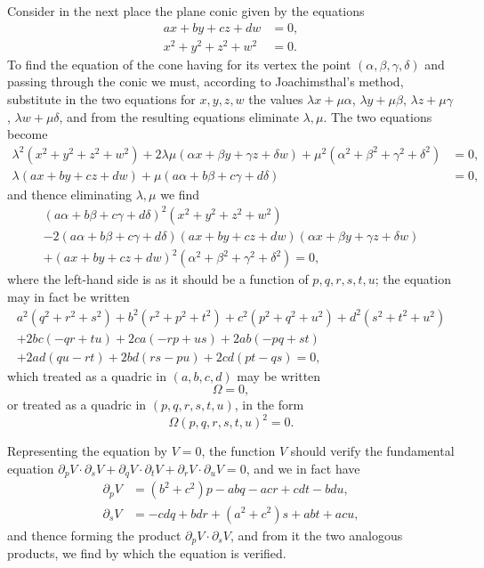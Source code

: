 \documentclass[11pt,a4paper]{article}
\theoremstyle{plain}
\begin{document}
Consider in the next place the plane conic given by the equations
\begin{align*}
ax + by + cz + dw &= 0,\\
x^2 + y^2 + z^2 + w^2 &= 0.
\end{align*}
To find the equation of the cone having for its vertex the point $(\alpha, \beta, \gamma, \delta)$ and passing through the conic we must, according to Joachimsthal's method, substitute in the two equations for $x, y, z, w$ the values $\lambda x + \mu\alpha$, $\lambda y + \mu\beta$, $\lambda z + \mu\gamma$, $\lambda w + \mu\delta$, and from the resulting equations eliminate $\lambda, \mu$. The two equations become
\begin{align*}
\lambda^2(x^2 + y^2 + z^2 + w^2) + 2\lambda\mu(\alpha x + \beta y + \gamma z + \delta w) + \mu^2(\alpha^2 + \beta^2 + \gamma^2 + \delta^2) &= 0,\\
\lambda(ax + by + cz + dw) + \mu(a\alpha + b\beta + c\gamma + d\delta) &= 0,
\end{align*}
and thence eliminating $\lambda, \mu$ we find
\begin{multline*}
(a\alpha + b\beta + c\gamma + d\delta)^2(x^2 + y^2 + z^2 + w^2)\\
- 2(a\alpha + b\beta + c\gamma + d\delta)(ax + by + cz + dw)(\alpha x + \beta y + \gamma z + \delta w)\\
+ (ax + by + cz + dw)^2(\alpha^2 + \beta^2 + \gamma^2 + \delta^2) = 0,
\end{multline*}
where the left-hand side is as it should be a function of $p, q, r, s, t, u$; the equation may in fact be written
\begin{multline*}
a^2(q^2 + r^2 + s^2) + b^2(r^2 + p^2 + t^2) + c^2(p^2 + q^2 + u^2) + d^2(s^2 + t^2 + u^2)\\
+ 2bc(-qr + tu) + 2ca(-rp + us) + 2ab(-pq + st)\\
+ 2ad(qu - rt) + 2bd(rs - pu) + 2cd(pt - qs) = 0,
\end{multline*}
which treated as a quadric in $(a, b, c, d)$ may be written
\[
\Omega = 0,
\]
or treated as a quadric in $(p, q, r, s, t, u)$, in the form
\[
\Omega(p, q, r, s, t, u)^2 = 0.
\]

Representing the equation by $V = 0$, the function $V$ should verify the fundamental equation $\partial_p V \cdot \partial_s V + \partial_q V \cdot \partial_t V + \partial_r V \cdot \partial_u V = 0$, and we in fact have
\begin{align*}
\partial_p V &= (b^2 + c^2)p - abq - acr + cdt - bdu,\\
\partial_s V &= -cdq + bdr + (a^2 + c^2)s + abt + acu,
\end{align*}
and thence forming the product $\partial_p V \cdot \partial_s V$, and from it the two analogous products, we find by which the equation is verified.
\end{document}
